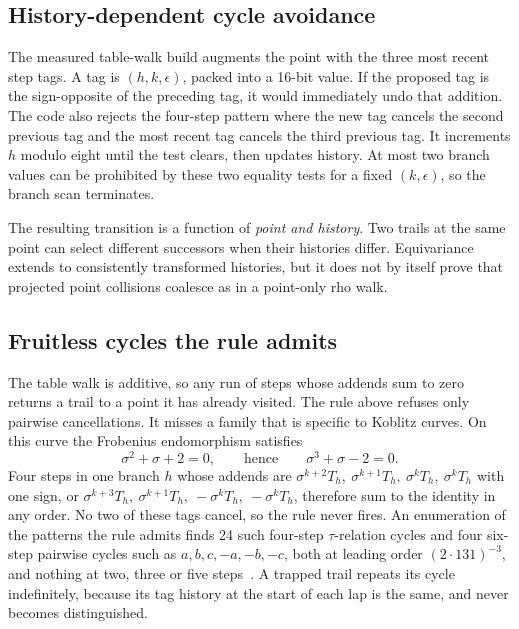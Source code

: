 \documentclass[11pt,a4paper]{article}
\begin{document}
\subsection{History-dependent cycle avoidance}\label{sec:history}
The measured table-walk build augments the point with the three most recent step tags. A tag is $(h,k,\epsilon)$, packed into a 16-bit value. If the proposed tag is the sign-opposite of the preceding tag, it would immediately undo that addition. The code also rejects the four-step pattern where the new tag cancels the second previous tag and the most recent tag cancels the third previous tag. It increments $h$ modulo eight until the test clears, then updates history. At most two branch values can be prohibited by these two equality tests for a fixed $(k,\epsilon)$, so the branch scan terminates.

The resulting transition is a function of \emph{point and history}. Two trails at the same point can select different successors when their histories differ. Equivariance extends to consistently transformed histories, but it does not by itself prove that projected point collisions coalesce as in a point-only rho walk.

\subsection{Fruitless cycles the rule admits}\label{sec:cycles}
The table walk is additive, so any run of steps whose addends sum to zero returns a trail to a point it has already visited. The rule above refuses only pairwise cancellations. It misses a family that is specific to Koblitz curves. On this curve the Frobenius endomorphism satisfies
\begin{equation}\label{eq:taurel}
 \sigma^2+\sigma+2=0,\qquad\text{hence}\qquad \sigma^3+\sigma-2=0 .
\end{equation}
Four steps in one branch $h$ whose addends are $\sigma^{k+2}T_h,\ \sigma^{k+1}T_h,\ \sigma^kT_h,\ \sigma^kT_h$ with one sign, or $\sigma^{k+3}T_h,\ \sigma^{k+1}T_h,\ -\sigma^kT_h,\ -\sigma^kT_h$, therefore sum to the identity in any order. No two of these tags cancel, so the rule never fires. An enumeration of the patterns the rule admits finds 24 such four-step $\tau$-relation cycles and four six-step pairwise cycles such as $a,b,c,-a,-b,-c$, both at leading order $(2\cdot131)^{-3}$, and nothing at two, three or five steps~\cite{walkconstant}. A trapped trail repeats its cycle indefinitely, because its tag history at the start of each lap is the same, and never becomes distinguished.
\end{document}

